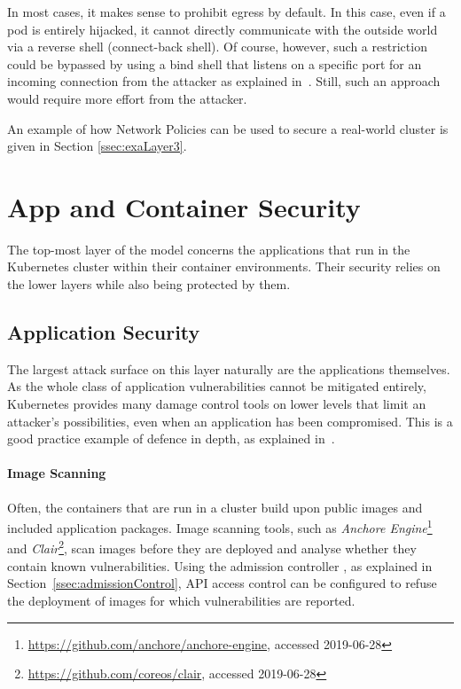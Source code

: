 In most cases, it makes sense to prohibit egress by default. In this case, even if a pod is entirely hijacked, it cannot directly communicate with the outside world via a reverse shell (connect-back shell). Of course, however, such a restriction could be bypassed by using a bind shell that listens on a specific port for an incoming connection from the attacker as explained in~\textcite{bindAndReverseShells}. Still, such an approach would require more effort from the attacker.

An example of how Network Policies can be used to secure a real-world cluster is given in Section \ref{ssec:exaLayer3}.

\section{App and Container Security} \label{sec:layer4}

The top-most layer of the model concerns the applications that run in the Kubernetes cluster within their container environments. Their security relies on the lower layers while also being protected by them.

\subsection{Application Security}

The largest attack surface on this layer naturally are the applications themselves. As the whole class of application vulnerabilities cannot be mitigated entirely, Kubernetes provides many damage control tools on lower levels that limit an attacker's possibilities, even when an application has been compromised. This is a good practice example of defence in depth, as explained in~\textcite{defenceInDepth}.

\paragraph{Image Scanning} 

Often, the containers that are run in a cluster build upon public images and included application packages. Image scanning tools, such as \textit{Anchore Engine}\footnote{\url{https://github.com/anchore/anchore-engine}, accessed 2019-06-28} and \textit{Clair}\footnote{\url{https://github.com/coreos/clair}, accessed 2019-06-28}, scan images before they are deployed and analyse whether they contain known vulnerabilities. Using the admission controller , as explained in Section~\ref{ssec:admissionControl}, API access control can be configured to refuse the deployment of images for which vulnerabilities are reported.  

